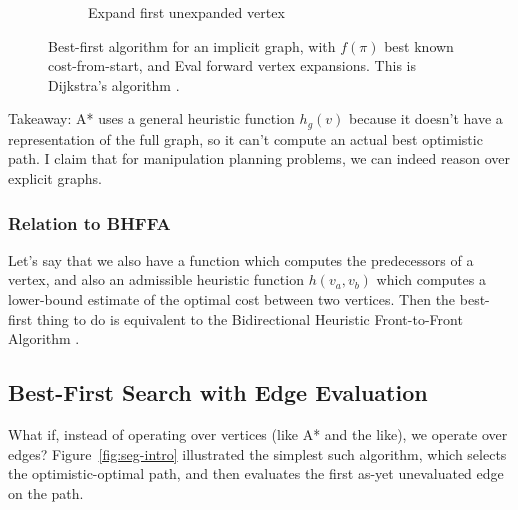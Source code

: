 \documentclass{report}
\begin{document}
\begin{figure}
\begin{subfigure}[b]{0.45\textwidth}
\caption{Expand first unexpanded vertex}
\end{subfigure}%
\caption{Best-first algorithm for an implicit graph,
   with $f(\pi)$ best known cost-from-start,
   and {\sc Eval} forward vertex expansions.
   This is Dijkstra's algorithm \cite{dijkstra1959anote}.}
\label{fig:seg-implicit}
\end{figure}

Takeaway: A* uses a general heuristic function $h_g(v)$
because it doesn't have a representation of the full graph,
so it can't compute an actual best optimistic path.
I claim that for manipulation planning problems,
we can indeed reason over explicit graphs.

\subsubsection{Relation to BHFFA}

Let's say that we also have a function which computes the predecessors
of a vertex,
and also an admissible heuristic function $h(v_a,v_b)$ which computes
a lower-bound estimate of the optimal cost between two vertices.
Then the best-first thing to do is equivalent to the
Bidirectional Heuristic Front-to-Front Algorithm \cite{sint1977bhffa}.

\subsection{Best-First Search with Edge Evaluation}

What if, instead of operating over vertices (like A* and the like),
we operate over edges?
Figure~\ref{fig:seg-intro} illustrated the simplest such algorithm,
which selects the optimistic-optimal path,
and then evaluates the first as-yet unevaluated edge on the path.
\end{document}
